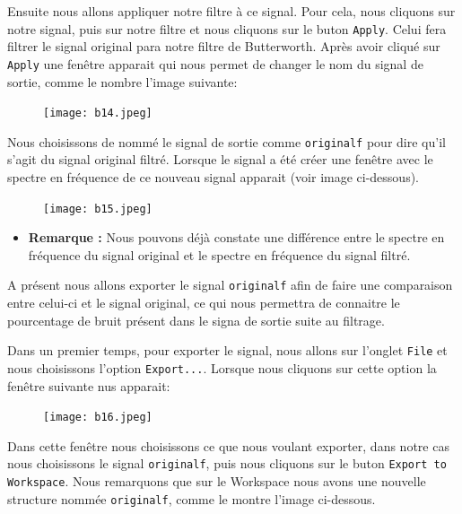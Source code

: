 \documentclass[conference,onecolumn]{IEEEtran}
\begin{document}
Ensuite nous allons appliquer notre filtre à ce signal. Pour cela, nous cliquons sur notre signal, puis sur notre filtre et nous cliquons sur le buton \texttt{Apply}. Celui fera filtrer le signal original para notre filtre de Butterworth. Après avoir cliqué sur \texttt{Apply} une fenêtre apparait qui nous permet de changer le nom du signal de sortie, comme le nombre l'image suivante:

 \begin{figure}[H]
 \centering
    \texttt{[image: b14.jpeg]}
\end{figure}


Nous choisissons de nommé le signal de sortie comme \texttt{originalf} pour dire qu'il s'agit du signal original filtré. Lorsque le signal a été créer une fenêtre avec le spectre en fréquence de ce nouveau signal apparait (voir image ci-dessous).

 \begin{figure}[H]
 \centering
    \texttt{[image: b15.jpeg]}
\end{figure}


\begin{itemize}
    \item[] \textbf{Remarque :} Nous pouvons déjà constate une différence entre le spectre en fréquence du signal original et le spectre en fréquence du signal filtré.
\end{itemize}

A présent nous allons exporter le signal \texttt{originalf} afin de faire une comparaison entre celui-ci et le signal original, ce qui nous permettra de connaitre le pourcentage de bruit présent dans le signa de sortie suite au filtrage. 

Dans un premier temps, pour exporter le signal, nous allons sur l'onglet \texttt{File} et nous choisissons l'option \texttt{Export...}. Lorsque nous cliquons sur cette option la fenêtre suivante nus apparait:

 \begin{figure}[H]
 \centering
    \texttt{[image: b16.jpeg]}
\end{figure}


Dans cette fenêtre nous choisissons ce que nous voulant exporter, dans notre cas nous choisissons le signal \texttt{originalf}, puis nous cliquons sur le buton \texttt{Export to Workspace}. Nous remarquons que sur le Workspace nous avons une nouvelle structure nommée \texttt{originalf}, comme le montre l'image ci-dessous.
\end{document}
